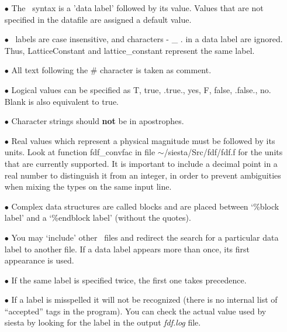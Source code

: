 \begin{itemize}

\item[$\bullet$] The \fdflib\ syntax is a 'data label' followed by its value.
Values that are not specified in the datafile are assigned
a default value.

\item[$\bullet$] \fdflib\ labels are case insensitive, and characters - \_ .
in a data label are ignored. Thus, LatticeConstant and
lattice\_constant represent the same label.

\item[$\bullet$] All text following the \# character is taken as comment.

\item[$\bullet$] Logical values can be specified as T, true, .true.,
yes, F, false, .false., no. Blank is also equivalent to true.

\item[$\bullet$] Character strings should \textbf{not} be in apostrophes.

\item[$\bullet$] Real values which represent a physical magnitude must be
followed by its units. Look at function fdf\_convfac in
file $\sim$/siesta/Src/fdf/fdf.f for the units that are currently supported.
It is important to include a decimal point in a real number to distinguish
it from an integer, in order to prevent ambiguities when mixing the types
on the same input line.

\item[$\bullet$] Complex data structures are called blocks and are
placed between `\%block label' and a `\%endblock label'
(without the quotes).

\item[$\bullet$] You may `include' other \fdflib\ files and redirect the search
for a particular data label to another file.
If a data label appears more than once, its first appearance
is used.

\item[$\bullet$] If the same label is specified twice, the first one takes precedence.

\item[$\bullet$] If a label is misspelled it will not be recognized (there is no
  internal list of ``accepted'' tags in the program). You can check 
  the actual value used by siesta by looking for the label in the
  output \textit{fdf.log} file.

\end{itemize}

